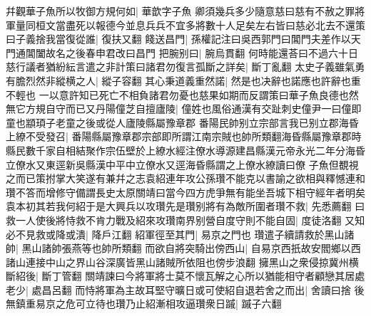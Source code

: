 幷觀華子魚所以牧御方規何如|{
	華歆字子魚}
卿須幾兵多少隨意慈曰慈有不赦之罪將軍量同桓文當盡死以報德今並息兵兵不宜多將數十人足矣左右皆曰慈必北去不還策曰子義捨我當復從誰|{
	復扶又翻}
餞送昌門|{
	孫權記注曰吳西郭門曰閶門夫差作以天門通閶闔故名之後春申君改曰昌門}
把腕别曰|{
	腕烏貫翻}
何時能還荅曰不過六十日慈行議者猶紛紜言遣之非計策曰諸君勿復言孤斷之詳矣|{
	斷丁亂翻}
太史子義雖氣勇有膽烈然非縱横之人|{
	縱子容翻}
其心秉道義重然諾|{
	然是也决辭也諾應也許辭也重不輕也}
一以意許知已死亡不相負諸君勿憂也慈果如期而反謂策曰華子魚良德也然無它方規自守而已又丹陽僮芝自擅廬陵|{
	僮姓也風俗通漢有交趾刺史僮尹一曰僮即童也顓頊子老童之後或從人廬陵縣屬豫章郡}
番陽民帥别立宗部言我已别立郡海昏上繚不受發召|{
	番陽縣屬豫章郡宗部即所謂江南宗賊也帥所類翻海昏縣屬豫章郡時縣民數千家自相結聚作宗伍壁於上繚水經注僚水導源建昌縣漢元帝永光二年分海昏立僚水又東逕新吳縣漢中平中立僚水又逕海昏縣謂之上僚水繚讀曰僚}
子魚但覩視之而已策拊掌大笑遂有兼幷之志袁紹連年攻公孫瓚不能克以書諭之欲相與釋憾連和瓚不答而增修守備謂長史太原關靖曰當今四方虎爭無有能坐吾城下相守經年者明矣袁本初其若我何紹于是大興兵以攻瓚先是瓚别將有為敵所圍者瓚不救|{
	先悉薦翻}
曰救一人使後將恃救不肯力戰及紹來攻瓚南界别營自度守則不能自固|{
	度徒洛翻}
又知必不見救或降或潰|{
	降戶江翻}
紹軍徑至其門|{
	易京之門也}
瓚遣子續請救於黑山諸帥|{
	黑山諸帥張燕等也帥所類翻}
而欲自將突騎出傍西山|{
	自易京西扺故安閻鄉以西諸山連接中山之界山谷深廣皆黑山諸賊所依阻也傍步浪翻}
擁黑山之衆侵掠冀州横斷紹後|{
	斷丁管翻}
關靖諫曰今將軍將士莫不懷瓦解之心所以猶能相守者顧戀其居處老少|{
	處昌呂翻}
而恃將軍為主故耳堅守曠日或可使紹自退若舍之而出|{
	舍讀曰捨}
後無鎮重易京之危可立待也瓚乃止紹漸相攻逼瓚衆日䠞|{
	䠞子六翻}


